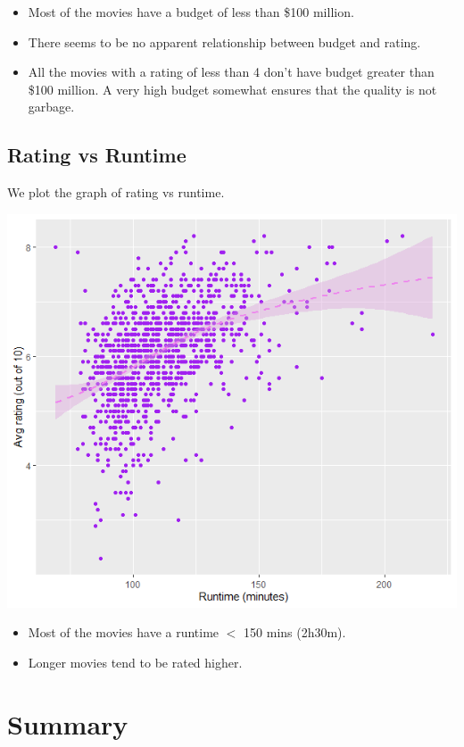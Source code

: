 \documentclass[10pt]{article}
\begin{document}
\begin{multicols}{2}
\begin{itemize}
    \item Most of the movies have a budget of less than \$100 million.
    \item There seems to be no apparent relationship between budget and rating.
    \item All the movies with a rating of less than 4 don't have budget greater than 
    \$100 million. A very high budget somewhat ensures that the quality is not garbage.
\end{itemize}

\subsection{Rating vs Runtime}

We plot the graph of rating vs runtime.

\includegraphics[scale=0.5]{rating_vs_runtime.png}

\begin{itemize}
    \item Most of the movies have a runtime $<$ 150 mins (2h30m).
    \item Longer movies tend to be rated higher.
\end{itemize}

\section{Summary}


\end{multicols}
\end{document}
